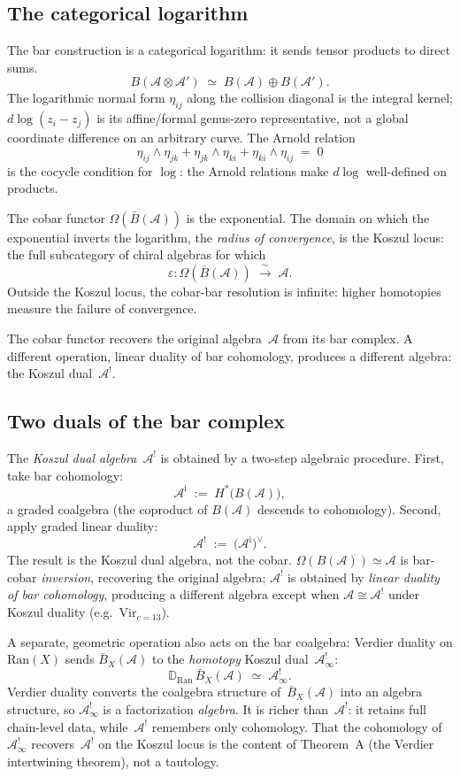 \documentclass[11pt]{report}
\theoremstyle{definition}
\theoremstyle{remark}
\providecommand{\cA}{\mathcal{A}}
\providecommand{\barB}{\bar{B}}
\numberwithin{equation}{section}
\begin{document}
\subsection*{The categorical logarithm}

The bar construction is a categorical logarithm: it sends tensor
products to direct sums.
\[
B(\cA\otimes\cA')
\;\simeq\;
B(\cA)\oplus B(\cA').
\]
The logarithmic normal form \(\eta_{ij}\) along the collision diagonal
is the integral kernel; \(d\log(z_i-z_j)\) is its affine/formal
genus-zero representative, not a global coordinate difference on an
arbitrary curve. The Arnold relation
\[
\eta_{ij}\wedge\eta_{jk}
+\eta_{jk}\wedge\eta_{ki}
+\eta_{ki}\wedge\eta_{ij}
\;=\;0
\]
is the cocycle condition for $\log$: the Arnold relations make
$d\log$ well-defined on products.

The cobar functor $\Omega(\barB(\cA))$ is the exponential. The
domain on which the exponential inverts the logarithm, the
\emph{radius of convergence}, is the Koszul locus: the full
subcategory of chiral algebras for which
\[
\varepsilon\colon\Omega(\barB(\cA))
\;\xrightarrow{\;\sim\;}\;
\cA.
\]
Outside the Koszul locus, the cobar-bar resolution is infinite:
higher homotopies measure the failure of convergence.

The cobar functor recovers the original algebra~$\cA$ from its
bar complex. A different operation, linear duality of bar cohomology,
produces a different algebra: the Koszul dual~$\cA^!$.

\subsection*{Two duals of the bar complex}

The \emph{Koszul dual algebra}~$\cA^!$ is obtained by a two-step
algebraic procedure. First, take bar cohomology:
\[
\cA^{\mathrm i}
\;:=\;
H^*\bigl(B(\cA)\bigr),
\]
a graded coalgebra (the coproduct of $B(\cA)$ descends to
cohomology). Second, apply graded linear duality:
\[
\cA^!
\;:=\;
\bigl(\cA^{\mathrm i}\bigr)^\vee.
\]
The result is the Koszul dual algebra, not the cobar.
$\Omega(B(\cA))\simeq\cA$ is bar-cobar \emph{inversion},
recovering the original algebra; $\cA^!$ is obtained by
\emph{linear duality of bar cohomology}, producing a different
algebra except when $\cA\cong\cA^!$ under Koszul duality (e.g.\ $\mathrm{Vir}_{c=13}$).

A separate, geometric operation also acts on the bar coalgebra:
Verdier duality on $\mathrm{Ran}(X)$ sends $\barB_X(\cA)$ to the
\emph{homotopy} Koszul dual~$\cA^!_\infty$:
\[
\mathbb D_{\mathrm{Ran}}\,\barB_X(\cA)
\;\simeq\;
\cA^!_\infty.
\]
Verdier duality converts the coalgebra structure of~$\barB_X(\cA)$
into an algebra structure, so $\cA^!_\infty$ is a factorization
\emph{algebra}. It is richer than~$\cA^!$: it retains full
chain-level data, while~$\cA^!$ remembers only cohomology. That
the cohomology of $\cA^!_\infty$ recovers~$\cA^!$ on the Koszul
locus is the content of Theorem~A (the Verdier intertwining
theorem), not a tautology.
\end{document}
